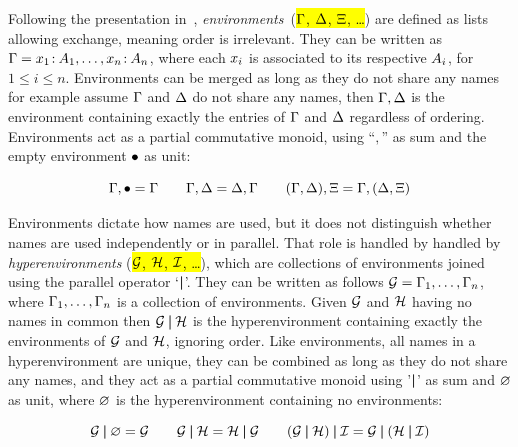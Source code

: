 Following the presentation in~\citet{abs-2106-11818}, \emph{environments}~(\hl{$\Gamma$, $\Delta$, $\Xi$, \dots}) are defined as lists allowing exchange, meaning order is irrelevant. They can be written as {$\Gamma = x_1\colon\mspace{-2mu}A_1, \dots, x_n\colon\mspace{-2mu}A_n$}, where each {$x_i$} is associated to its respective {$A_i$}, for $1\leq i \leq n$. Environments can be merged as long as they do not share any names for example assume {$\Gamma$} and {$\Delta$} do not share any names, then {$\Gamma, \Delta$} is the environment containing exactly the entries of {$\Gamma$} and {$\Delta$} regardless of ordering. Environments act as a partial commutative monoid, using ``$,$'' as sum and the empty environment {$\bullet$} as unit:

\begin{highlight} %
\[
\Gamma, \bullet = \Gamma
\qquad
\Gamma, \Delta = \Delta, \Gamma
\qquad
(\Gamma, \Delta), \Xi = \Gamma, (\Delta , \Xi)
\]
\end{highlight}

Environments dictate how names are used, but it does not distinguish whether names are used independently or in parallel. That role is handled by  handled by \emph{hyperenvironments} (\hl{$\mathcal{G}$, $\mathcal{H}$, $\mathcal{I}$, \dots}), which are collections of environments joined using the parallel operator `$\mathbin{\boldsymbol{|}}$'. They can be written as follows {$\mathcal{G} = \Gamma_1,\dots, \Gamma_n$}, where {$\Gamma_1,\dots, \Gamma_n$} is a collection of environments. Given {$\mathcal{G}$} and {$\mathcal{H}$} having no names in common then {$\mathcal{G} \mathbin{\boldsymbol{|}} \mathcal{H}$} is the hyperenvironment containing exactly the environments of {$\mathcal{G}$} and {$\mathcal{H}$}, ignoring order. Like environments, all names in a hyperenvironment are unique, they can be combined as long as they do not share any names, and they act as a partial commutative monoid using '$\mathbin{\boldsymbol{|}}$' as sum and $\varnothing$ as unit, where $\varnothing$ is the hyperenvironment containing no environments:

\begin{highlight} %
\[
  \mathcal{G} \mathbin{\boldsymbol{|}} \varnothing = \mathcal{G}
  \qquad
  \mathcal{G} \mathbin{\boldsymbol{|}} \mathcal{H} = \mathcal{H} \mathbin{\boldsymbol{|}} \mathcal{G}
  \qquad
  (\mathcal{G} \mathbin{\boldsymbol{|}} \mathcal{H}) \mathbin{\boldsymbol{|}} \mathcal{I} = \mathcal{G} \mathbin{\boldsymbol{|}} (\mathcal{H} \mathbin{\boldsymbol{|}} \mathcal{I})
\]
\end{highlight}

